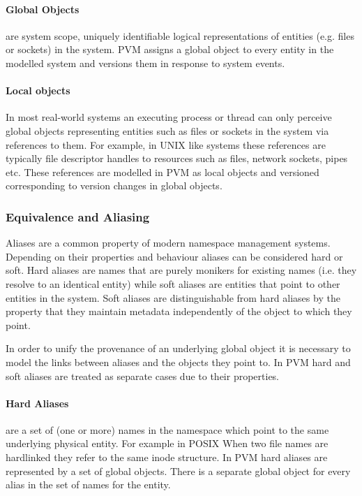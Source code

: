 \documentclass[withindex,glossary]{cam-thesis}
\begin{document}
\paragraph{Global Objects} are system scope, uniquely identifiable logical representations of entities (e.g. files or sockets) in the system.
PVM assigns a global object to every entity in the modelled system and versions them in response to system events.

\paragraph{Local objects}
In most real-world systems an executing process or thread can only perceive global objects representing entities such as files or sockets in the system via references to them.
For example, in UNIX like systems these references are typically file descriptor handles to resources such as files, network sockets, pipes etc.
These references are modelled in PVM as local objects and versioned corresponding to version changes in global objects.

\subsubsection{Equivalence and Aliasing}
Aliases are a common property of modern namespace management systems.
Depending on their properties and behaviour aliases can be considered hard or soft. 
Hard aliases are names that are purely monikers for existing names (i.e. they resolve to an identical entity) while soft aliases are entities that point to other entities in the system. 
Soft aliases are distinguishable from hard aliases by the property that they maintain metadata independently of the object to which they point.

In order to unify the provenance of an underlying global object it is necessary to model the links between aliases and the objects they point to.
In PVM hard and soft aliases are treated as separate cases due to their properties.

\paragraph{Hard Aliases} are a set of (one or more) names in the namespace which point to the same underlying physical entity.
For example in POSIX When two file names are hardlinked they refer to the same inode structure.
In PVM hard aliases are represented by a set of global objects.
There is a separate global object for every alias in the set of names for the entity.
\end{document}
